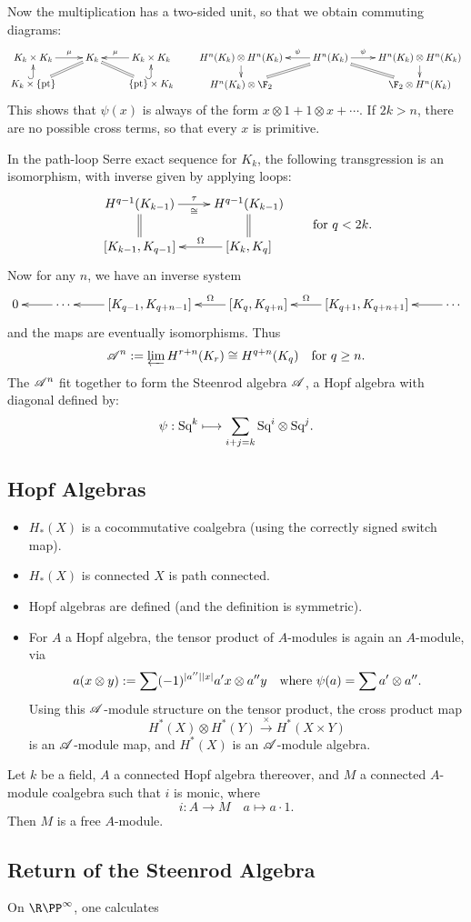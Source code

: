 \documentclass[11pt]{article}
\begin{document}
\noindent Now the multiplication has a two-sided unit, so that we obtain commuting diagrams:
\[\xymatrix@R=.4cm{
K_k\times K_k
\ar[r]^-{\mu}
&%
K_k
\ar@{=}[rd]
\ar@{=}[ld]
&%
K_k\times K_k
\ar[l]_-{\mu}
\\%
K_k\times\{\textup{pt}\}\ar@{^{(}->}[u]
&%
&%
\{\textup{pt}\}\times K_k\ar@{^{(}->}[u]
}\qquad 
\xymatrix@R=.4cm{
H^n(K_k)\otimes H^n(K_k)
\ar[r];[]_-{\psi}
&%
H^n(K_k)
\ar@{=}[dr];[]\ar@{=}[dl];[]
&%
H^n(K_k)\otimes H^n(K_k)
\ar[l];[]^-{\psi}
\\%
H^n(K_k)\otimes\F_2\ar[u];[]
&%
&%
\F_2\otimes H^n(K_k)\ar[u];[]
}\]
This shows that $\psi(x)$ is always of the form $x\otimes 1+1\otimes x+\cdots$. If $2k>n$, there are no possible cross terms, so that every $x$ is primitive.

In the path-loop Serre exact sequence for $K_k$, the following transgression is an isomorphism, with inverse given by applying loops:
\[\vcenter{\xymatrix@R=6mm{
{H}^{q-1}(K_{k-1})
\ar[r]_-{\cong}^-{\tau}
\ar@{=}[d]
&%
{H}^{q-1}(K_{k-1})
\ar@{=}[d]
\\%
[K_{k-1},K_{q-1}]
&%
[K_{k},K_{q}]
\ar[l]_-{\Omega}
}}\textup{\qquad for $q<2k$}.\]
Now for any $n$, we have an inverse system
\[\xymatrix{
0&
\ar[l]\cdots&
[K_{q-1},K_{q+n-1}]\ar[l]&
[K_q,K_{q+n}]\ar[l]_-\Omega&
[K_{q+1},K_{q+n+1}]\ar[l]_-\Omega&
\cdots\ar[l]}\]
and the maps are eventually isomorphisms. Thus
\[\mathscr{A}^n:=\varprojlim H^{r+n}(K_r)\cong H^{q+n}(K_q)\textup{\quad for $q\geq n$.}\]
The $\mathscr{A}^n$ fit together to form the Steenrod algebra $\mathscr{A}$, a Hopf algebra with diagonal defined by:
\[\psi:\textup{Sq}^k\longmapsto\sum_{i+j=k}\textup{Sq}^i\otimes\textup{Sq}^j.\]
\subsection{Hopf Algebras}
\begin{itemize}\squishlist
\item $H_*(X)$ is a cocommutative coalgebra (using the correctly signed switch map).
\item $H_*(X)$ is connected \Iff $X$ is path connected.
\item Hopf algebras are defined (and the definition is symmetric).
\item For $A$ a Hopf algebra, the tensor product of $A$-modules is again an $A$-module, via
\[a(x\otimes y):=\sum(-1)^{|a''||x|}a'x\otimes a''y\textup{\quad where $\psi(a)=\sum a'\otimes a''$.}\]
Using this $\mathscr{A}$-module structure on the tensor product, the cross product map
\[H^*(X)\otimes H^*(Y)\overset{\times }{\to}H^*(X\times Y)\]
is an $\mathscr{A}$-module map, and $H^*(X)$ is an $\mathscr{A}$-module algebra.
\end{itemize}
\begin{prop*}
Let $k$ be a field, $A$ a connected Hopf algebra thereover, and $M$ a connected $A$-module coalgebra such that $i$ is monic, where
\[i:A\to M\quad a\mapsto a\cdot 1.\]
 Then $M$ is a free $A$-module.
\end{prop*}
\subsection{Return of the Steenrod Algebra}
On $\RP^\infty$, one calculates
\end{document}
